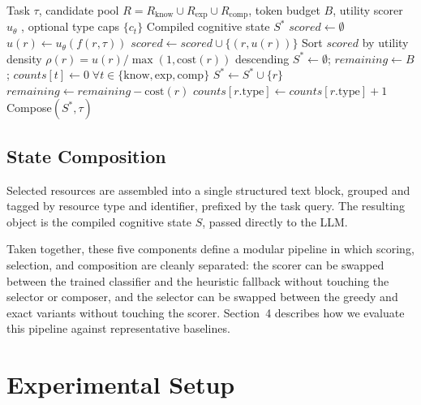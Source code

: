 \documentclass{article}
\begin{document}
\begin{algorithm}[t]
\caption{Cognitive State Compilation (CSC)}
\label{alg:csc}
\begin{algorithmic}[1]
\Require Task $\tau$, candidate pool $R = R_{\text{know}} \cup R_{\text{exp}} \cup R_{\text{comp}}$, token budget $B$, utility scorer $u_\theta$ \citep{chen2016xgboost}, optional type caps $\{c_t\}$
\Ensure Compiled cognitive state $S^*$
\State $scored \gets \emptyset$
  \State $u(r) \gets u_\theta(f(r, \tau))$ 
  \State $scored \gets scored \cup \{(r, u(r))\}$
\EndFor
\State Sort $scored$ by utility density $\rho(r) = u(r)/\max(1, \text{cost}(r))$ descending \citep{dantzig1957discrete}
\State $S^* \gets \emptyset$; $remaining \gets B$; $counts[t] \gets 0 \; \forall t \in \{\text{know}, \text{exp}, \text{comp}\}$
    \State $S^* \gets S^* \cup \{r\}$
    \State $remaining \gets remaining - \text{cost}(r)$
    \State $counts[r.\text{type}] \gets counts[r.\text{type}] + 1$
  \EndIf
\EndFor
\State \Return Compose$(S^*, \tau)$ 
\end{algorithmic}
\end{algorithm}

\subsection{State Composition}

Selected resources are assembled into a single structured text block, grouped and tagged by resource type and identifier, prefixed by the task query. The resulting object is the compiled cognitive state $S$, passed directly to the LLM.

Taken together, these five components define a modular pipeline in which scoring, selection, and composition are cleanly separated: the scorer can be swapped between the trained classifier and the heuristic fallback without touching the selector or composer, and the selector can be swapped between the greedy and exact variants without touching the scorer. Section~4 describes how we evaluate this pipeline against representative baselines.

\section{Experimental Setup}
\end{document}

